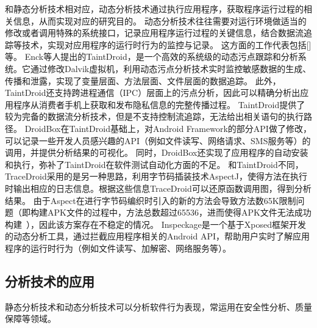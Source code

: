 和静态分析技术相对应，动态分析技术通过执行应用程序，获取程序运行过程的相关信息，从而实现对应的研究目的。
动态分析技术往往需要对运行环境做适当的修改或者调用特殊的系统接口，记录应用程序运行过程的关键信息，结合数据流追踪等技术，实现对应用程序的运行时行为的监控与记录。
这方面的工作代表包括[]等。
Enck等人提出的TaintDroid\cite{chun2014taintdroid}，是一个高效的系统级的动态污点跟踪和分析系统。它通过修改Dalvik虚拟机，利用动态污点分析技术实时监控敏感数据的生成、传播和泄露，实现了变量层面、方法层面、文件层面的数据追踪。
此外，TaintDroid还支持跨进程通信（IPC）层面上的污点分析，因此可以精确分析出应用程序从消费者手机上获取和发布隐私信息的完整传播过程。
TaintDroid提供了较为完备的数据流分析技术，但是不支持控制流追踪，无法给出相关语句的执行路径。
DroidBox\cite{droidbox:online}在TaintDroid基础上，对Android Framework的部分API做了修改，可以记录一些开发人员感兴趣的API（例如文件读写、网络请求、SMS服务等）的调用，并提供分析结果的可视化。
同时，DroidBox还实现了应用程序的自动安装和执行，弥补了TaintDroid在软件测试自动化方面的不足。
和TaintDroid不同，TraceDroid\cite{van2013dynamic}采用的是另一种思路，利用字节码插装技术AspectJ，使得方法在执行时输出相应的日志信息。根据这些信息TraceDroid可以还原函数调用图，得到分析结果。
由于Aspect在进行字节码编织时引入的新的方法会导致方法数65K限制问题（即构建APK文件的过程中，方法总数超过65536，进而使得APK文件无法成功构建~\cite{Configur27}），因此该方案存在不稳定的情况。
Inspeckage\cite{acpmInsp34}是一个基于Xposed框架开发的动态分析工具，通过拦截应用程序相关的Android API，帮助用户实时了解应用程序的运行时行为（例如文件读写、加解密、网络服务等）。





\subsection{分析技术的应用}

静态分析技术和动态分析技术可以分析软件行为表现，常运用在安全性分析、质量保障等领域。




